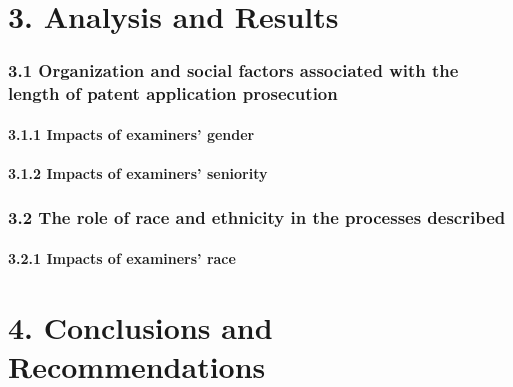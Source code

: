 \documentclass[
]{article}
\begin{document}
\hypertarget{analysis-and-results}{%
\section{3. Analysis and Results}\label{analysis-and-results}}

\hypertarget{organization-and-social-factors-associated-with-the-length-of-patent-application-prosecution}{%
\subsubsection{3.1 Organization and social factors associated with the
length of patent application
prosecution}\label{organization-and-social-factors-associated-with-the-length-of-patent-application-prosecution}}

\hypertarget{impacts-of-examiners-gender}{%
\paragraph{3.1.1 Impacts of examiners'
gender}\label{impacts-of-examiners-gender}}

\hypertarget{impacts-of-examiners-seniority}{%
\paragraph{3.1.2 Impacts of examiners'
seniority}\label{impacts-of-examiners-seniority}}

\hypertarget{the-role-of-race-and-ethnicity-in-the-processes-described}{%
\subsubsection{3.2 The role of race and ethnicity in the processes
described}\label{the-role-of-race-and-ethnicity-in-the-processes-described}}

\hypertarget{impacts-of-examiners-race}{%
\paragraph{3.2.1 Impacts of examiners'
race}\label{impacts-of-examiners-race}}

\hypertarget{conclusions-and-recommendations}{%
\section{4. Conclusions and
Recommendations}\label{conclusions-and-recommendations}}
\end{document}
